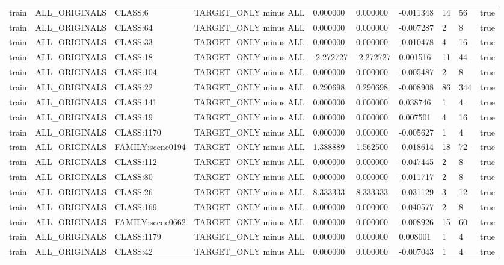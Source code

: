\begin{tabular}{llllllllll}
train & ALL\_ORIGINALS & CLASS:6 & TARGET\_ONLY minus ALL & 0.000000 & 0.000000 & -0.011348 & 14 & 56 & true \\
train & ALL\_ORIGINALS & CLASS:64 & TARGET\_ONLY minus ALL & 0.000000 & 0.000000 & -0.007287 & 2 & 8 & true \\
train & ALL\_ORIGINALS & CLASS:33 & TARGET\_ONLY minus ALL & 0.000000 & 0.000000 & -0.010478 & 4 & 16 & true \\
train & ALL\_ORIGINALS & CLASS:18 & TARGET\_ONLY minus ALL & -2.272727 & -2.272727 & 0.001516 & 11 & 44 & true \\
train & ALL\_ORIGINALS & CLASS:104 & TARGET\_ONLY minus ALL & 0.000000 & 0.000000 & -0.005487 & 2 & 8 & true \\
train & ALL\_ORIGINALS & CLASS:22 & TARGET\_ONLY minus ALL & 0.290698 & 0.290698 & -0.008908 & 86 & 344 & true \\
train & ALL\_ORIGINALS & CLASS:141 & TARGET\_ONLY minus ALL & 0.000000 & 0.000000 & 0.038746 & 1 & 4 & true \\
train & ALL\_ORIGINALS & CLASS:19 & TARGET\_ONLY minus ALL & 0.000000 & 0.000000 & 0.007501 & 4 & 16 & true \\
train & ALL\_ORIGINALS & CLASS:1170 & TARGET\_ONLY minus ALL & 0.000000 & 0.000000 & -0.005627 & 1 & 4 & true \\
train & ALL\_ORIGINALS & FAMILY:scene0194 & TARGET\_ONLY minus ALL & 1.388889 & 1.562500 & -0.018614 & 18 & 72 & true \\
train & ALL\_ORIGINALS & CLASS:112 & TARGET\_ONLY minus ALL & 0.000000 & 0.000000 & -0.047445 & 2 & 8 & true \\
train & ALL\_ORIGINALS & CLASS:80 & TARGET\_ONLY minus ALL & 0.000000 & 0.000000 & -0.011717 & 2 & 8 & true \\
train & ALL\_ORIGINALS & CLASS:26 & TARGET\_ONLY minus ALL & 8.333333 & 8.333333 & -0.031129 & 3 & 12 & true \\
train & ALL\_ORIGINALS & CLASS:169 & TARGET\_ONLY minus ALL & 0.000000 & 0.000000 & -0.040577 & 2 & 8 & true \\
train & ALL\_ORIGINALS & FAMILY:scene0662 & TARGET\_ONLY minus ALL & 0.000000 & 0.000000 & -0.008926 & 15 & 60 & true \\
train & ALL\_ORIGINALS & CLASS:1179 & TARGET\_ONLY minus ALL & 0.000000 & 0.000000 & 0.008001 & 1 & 4 & true \\
train & ALL\_ORIGINALS & CLASS:42 & TARGET\_ONLY minus ALL & 0.000000 & 0.000000 & -0.007043 & 1 & 4 & true \\

\end{tabular}
